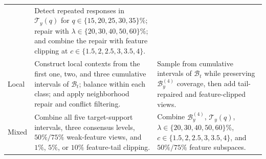 \begin{longtable}{@{}>{\raggedright\arraybackslash}p{}
                      >{\raggedright\arraybackslash}p{}
                      >{\raggedright\arraybackslash}p{}@{}}
      & Detect repeated responses in $\mathcal T_y(q)$ for
        $q\in\{15,20,25,30,35\}\%$; repair with
        $\lambda\in\{20,30,40,50,60\}\%$; and combine the repair with feature
        clipping at $c\in\{1.5,2,2.5,3,3.5,4\}$. \\
    Local
      & Construct local contexts from the first one, two, and three cumulative
        intervals of $\mathcal B_t$; balance within each class; and apply
        neighborhood repair and conflict filtering.
      & Sample from cumulative intervals of $\mathcal B_t$ while preserving
        $\mathcal B_y^{(4)}$ coverage, then add tail-repaired and
        feature-clipped views. \\
    Mixed
      & Combine all five target-support intervals, three consensus levels,
        $50\%/75\%$ weak-feature views, and $1\%$, $5\%$, or $10\%$
        feature-tail clipping.
      & Combine $\mathcal B_y^{(4)}$, $\mathcal T_y(q)$,
        $\lambda\in\{20,30,40,50,60\}\%$,
        $c\in\{1.5,2,2.5,3,3.5,4\}$, and $50\%/75\%$ feature
        subspaces. \\
  \end{longtable}
\endgroup

